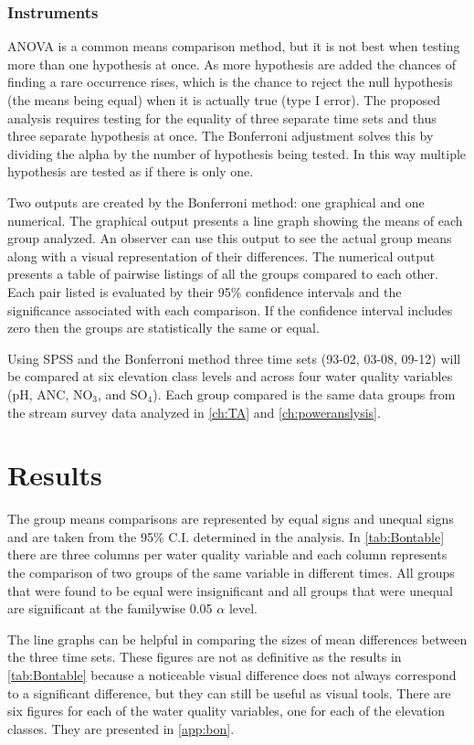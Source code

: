 \subsubsection{Instruments}
ANOVA is a common means comparison method, but it is not best when testing more than one hypothesis at once.
As more hypothesis are added the chances of finding a rare occurrence rises, which is the chance to reject the null hypothesis (the means being equal) when it is actually true (type I error).
The proposed analysis requires testing for the equality of three separate time sets and thus three separate hypothesis at once.
The Bonferroni adjustment solves this by dividing the alpha by the number of hypothesis being tested.
In this way multiple hypothesis are tested as if there is only one.

Two outputs are created by the Bonferroni method: one graphical and one numerical.
The graphical output presents a line graph showing the means of each group analyzed.
An observer can use this output to see the actual group means along with a visual representation of their differences.
The numerical output presents a table of pairwise listings of all the groups compared to each other.
Each pair listed is evaluated by their 95$\%$ confidence intervals and the significance associated with each comparison.
If the confidence interval includes zero then the groups are statistically the same or equal.

Using SPSS and the Bonferroni method three time sets (93-02, 03-08, 09-12) will be compared at six elevation class levels and across four water quality variables (pH, ANC, NO$_3$, and SO$_4 $).
Each group compared is the same data groups from the stream survey data analyzed in \autoref{ch:TA} and \autoref{ch:poweranslysis}.

\section{Results}


The group means comparisons are represented by equal signs and unequal signs and are taken from the 95$\%$ C.I. determined in the analysis.
In \autoref{tab:Bontable} there are three columns per water quality variable and each column represents the comparison of two groups of the same variable in different times.
All groups that were found to be equal were insignificant and all groups that were unequal are significant at the familywise 0.05 $\alpha$ level.

The line graphs can be helpful in comparing the sizes of mean differences between the three time sets.
These figures are not as definitive as the results in \autoref{tab:Bontable} because a noticeable visual difference does not always correspond to a significant difference, but they can still be useful as visual tools.
There are six figures for each of the water quality variables, one for each of the elevation classes.
They are presented in \autoref{app:bon}.

